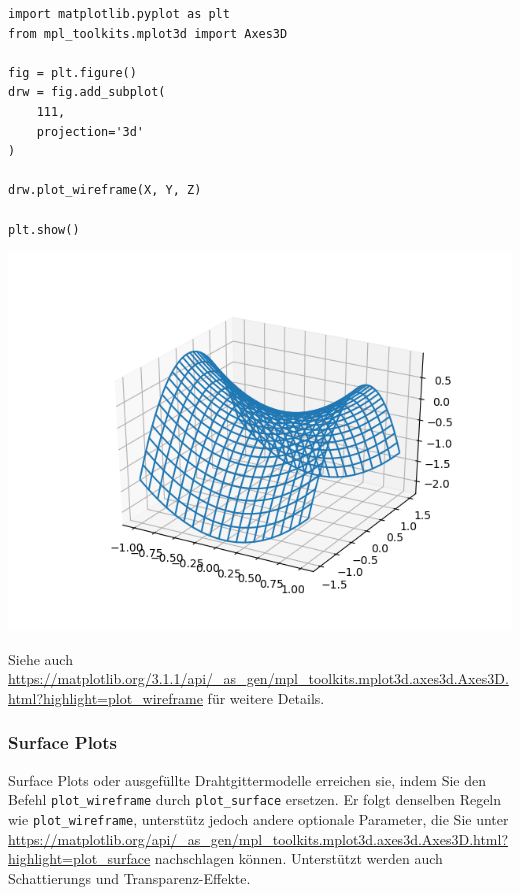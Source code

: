 \begin{codebox}[Beispiel: Drahtgittermodell, width=.55\linewidth, nobeforeafter, equal height group = grpXmpWireframe]
\begin{verbatim}
import matplotlib.pyplot as plt
from mpl_toolkits.mplot3d import Axes3D

fig = plt.figure()
drw = fig.add_subplot(
    111,
    projection='3d'
)

drw.plot_wireframe(X, Y, Z)

plt.show()
\end{verbatim}
\end{codebox}
%
\begin{tcolorbox}[title=Ausgabe: Drahtgittermodell, width=.45\linewidth, nobeforeafter, equal height group = grpXmpWireframe]
	\includegraphics[width=\linewidth]{./gfx/plt-wireframe}
\end{tcolorbox}
Siehe auch \url{https://matplotlib.org/3.1.1/api/_as_gen/mpl_toolkits.mplot3d.axes3d.Axes3D.html?highlight=plot_wireframe} für weitere Details.

\subsubsection{Surface Plots}
Surface Plots oder ausgefüllte Drahtgittermodelle erreichen sie, indem Sie den Befehl \texttt{plot\_wireframe} durch \texttt{plot\_surface} ersetzen. Er folgt denselben Regeln wie \texttt{plot\_wireframe}, unterstütz jedoch andere optionale Parameter, die Sie unter \url{https://matplotlib.org/api/_as_gen/mpl_toolkits.mplot3d.axes3d.Axes3D.html?highlight=plot_surface} nachschlagen können. Unterstützt werden auch Schattierungs und Transparenz-Effekte.

